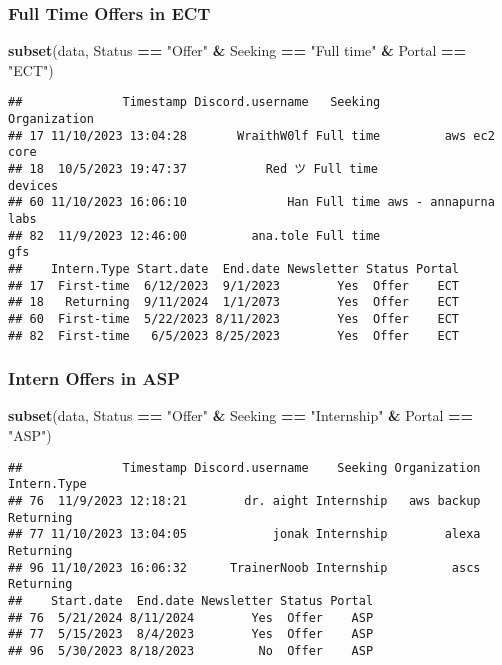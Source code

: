 \documentclass[
]{article}
\newenvironment{Shaded}{\begin{snugshade}}{\end{snugshade}}
\newcommand{\FunctionTok}[1]{\textcolor[rgb]{0.13,0.29,0.53}{\textbf{#1}}}
\newcommand{\NormalTok}[1]{#1}
\newcommand{\SpecialCharTok}[1]{\textcolor[rgb]{0.81,0.36,0.00}{\textbf{#1}}}
\newcommand{\StringTok}[1]{\textcolor[rgb]{0.31,0.60,0.02}{#1}}
\begin{document}
\hypertarget{full-time-offers-in-ect}{%
\subsubsection{Full Time Offers in ECT}\label{full-time-offers-in-ect}}

\begin{Shaded}
\begin{Highlighting}[]
\FunctionTok{subset}\NormalTok{(data, Status }\SpecialCharTok{==} \StringTok{"Offer"} \SpecialCharTok{\&}\NormalTok{ Seeking }\SpecialCharTok{==} \StringTok{"Full time"} \SpecialCharTok{\&}\NormalTok{ Portal }\SpecialCharTok{==} \StringTok{"ECT"}\NormalTok{)}
\end{Highlighting}
\end{Shaded}

\begin{verbatim}
##              Timestamp Discord.username   Seeking         Organization
## 17 11/10/2023 13:04:28       WraithW0lf Full time         aws ec2 core
## 18  10/5/2023 19:47:37           Red ツ Full time              devices
## 60 11/10/2023 16:06:10              Han Full time aws - annapurna labs
## 82  11/9/2023 12:46:00         ana.tole Full time                  gfs
##    Intern.Type Start.date  End.date Newsletter Status Portal
## 17  First-time  6/12/2023  9/1/2023        Yes  Offer    ECT
## 18   Returning  9/11/2024  1/1/2073        Yes  Offer    ECT
## 60  First-time  5/22/2023 8/11/2023        Yes  Offer    ECT
## 82  First-time   6/5/2023 8/25/2023        Yes  Offer    ECT
\end{verbatim}

\hypertarget{intern-offers-in-asp}{%
\subsubsection{Intern Offers in ASP}\label{intern-offers-in-asp}}

\begin{Shaded}
\begin{Highlighting}[]
\FunctionTok{subset}\NormalTok{(data, Status }\SpecialCharTok{==} \StringTok{"Offer"} \SpecialCharTok{\&}\NormalTok{ Seeking }\SpecialCharTok{==} \StringTok{"Internship"} \SpecialCharTok{\&}\NormalTok{ Portal }\SpecialCharTok{==} \StringTok{"ASP"}\NormalTok{)}
\end{Highlighting}
\end{Shaded}

\begin{verbatim}
##              Timestamp Discord.username    Seeking Organization Intern.Type
## 76  11/9/2023 12:18:21        dr. aight Internship   aws backup   Returning
## 77 11/10/2023 13:04:05            jonak Internship        alexa   Returning
## 96 11/10/2023 16:06:32      TrainerNoob Internship         ascs   Returning
##    Start.date  End.date Newsletter Status Portal
## 76  5/21/2024 8/11/2024        Yes  Offer    ASP
## 77  5/15/2023  8/4/2023        Yes  Offer    ASP
## 96  5/30/2023 8/18/2023         No  Offer    ASP
\end{verbatim}
\end{document}
